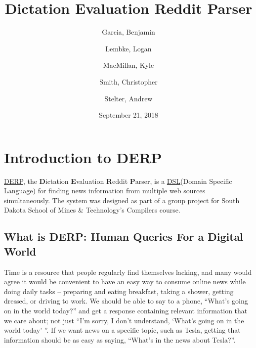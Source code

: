 \documentclass{article}
\title{\textbf{Dictation Evaluation Reddit Parser}}
\author{
Garcia, Benjamin \and
Lembke, Logan \and 
MacMillan, Kyle  \and 
Smith, Christopher \and 
Stelter, Andrew 
}
\date{September 21, 2018}
\renewcommand\maketitle{}
\begin{document}
\maketitle %

\newpage
\tableofcontents
{}




\newpage
\hypersetup{
    colorlinks,
    citecolor=blue,
    filecolor=black,
    linkcolor=blue,
    urlcolor=blue
}

\section{\textbf{Introduction to DERP}}

\setcounter{page}{1} %
\href{https://gitlab.mcs.sdsmt.edu/7184015/DERP}{DERP}, the \textbf{D}ictation \textbf{E}valuation \textbf{R}eddit \textbf{P}arser, is a \href{https://en.wikipedia.org/wiki/Domain-specific_language}{DSL}(Domain Specific Language) for finding news information from multiple web sources simultaneously. The system was designed as part of a group project for South Dakota School of Mines \& Technology's Compilers course.

\subsection{What is DERP: Human Queries For a Digital World}\label{sec:whatisDERP}
Time is a resource that people regularly find themselves lacking, and many would agree it would be convenient to have an easy way to consume online news while doing daily tasks -- preparing and eating breakfast, taking a shower, getting dressed, or driving to work. We should be able to say to a phone, ``What's going on in the world today?'' and get a response containing relevant information that we care about; not just ``I'm sorry, I don't understand, `What's going on in the world today' ''. If we want news on a specific topic, such as Tesla, getting that information should be as easy as saying, ``What's in the news about Tesla?''. 
\end{document}
